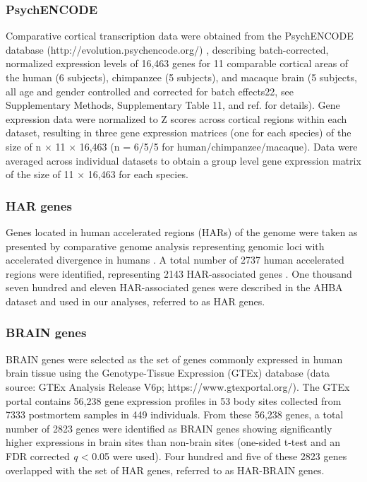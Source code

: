\begin{refsection}
\subsubsection*{PsychENCODE}
Comparative cortical transcription data were obtained from the PsychENCODE database (http://evolution.psychencode.org/) \citep{sousa2017molecular}, describing batch-corrected, normalized expression levels of 16,463 genes for 11 comparable cortical areas of the human (6 subjects), chimpanzee (5 subjects), and macaque brain (5 subjects, all age and gender controlled and corrected for batch effects22, see Supplementary Methods, Supplementary Table 11, and ref. \citep{sousa2017molecular} for details). Gene expression data were normalized to Z scores across cortical regions within each dataset, resulting in three gene expression matrices (one for each species) of the size of n $\times$ 11 $\times$ 16,463 (n = 6/5/5 for human/chimpanzee/macaque). Data were averaged across individual datasets to obtain a group level gene expression matrix of the size of 11 $\times$ 16,463 for each species.

\subsubsection*{HAR genes}
Genes located in human accelerated regions (HARs) of the genome were taken as presented by comparative genome analysis representing genomic loci with accelerated divergence in humans \citep{doan2016mutations}. A total number of 2737 human accelerated regions were identified, representing 2143 HAR-associated genes \citep{doan2016mutations}. One thousand seven hundred and eleven HAR-associated genes were described in the AHBA dataset and used in our analyses, referred to as HAR genes.

\subsubsection*{BRAIN genes}
BRAIN genes were selected as the set of genes commonly expressed in human brain tissue using the Genotype-Tissue Expression (GTEx) database (data source: GTEx Analysis Release V6p; https://www.gtexportal.org/). The GTEx portal contains 56,238 gene expression profiles in 53 body sites collected from 7333 postmortem samples in 449 individuals. From these 56,238 genes, a total number of 2823 genes were identified as BRAIN genes showing significantly higher expressions in brain sites than non-brain sites (one-sided t-test and an FDR corrected \textit{q} < 0.05 were used). Four hundred and five of these 2823 genes overlapped with the set of HAR genes, referred to as HAR-BRAIN genes.


\end{refsection}
